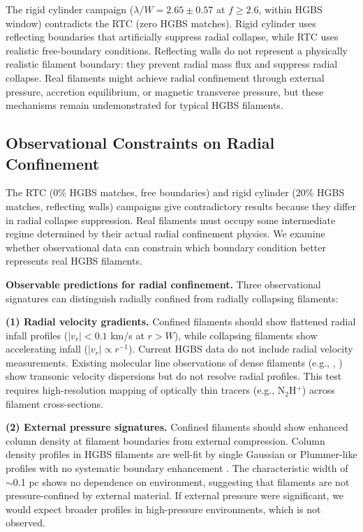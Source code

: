 \documentclass[twocolumn]{mnras}
\begin{document}
The rigid cylinder campaign ($\lambda/W = 2.65 \pm 0.57$ at $f \geq 2.6$, within HGBS window) contradicts the RTC (zero HGBS matches). Rigid cylinder uses reflecting boundaries that artificially suppress radial collapse, while RTC uses realistic free-boundary conditions. Reflecting walls do not represent a physically realistic filament boundary: they prevent radial mass flux and suppress radial collapse. Real filaments might achieve radial confinement through external pressure, accretion equilibrium, or magnetic transverse pressure, but these mechanisms remain undemonstrated for typical HGBS filaments.

\subsection{Observational Constraints on Radial Confinement}
\label{sec:radial_confinement}

The RTC (0\% HGBS matches, free boundaries) and rigid cylinder (20\% HGBS matches, reflecting walls) campaigns give contradictory results because they differ in radial collapse suppression. Real filaments must occupy some intermediate regime determined by their actual radial confinement physics. We examine whether observational data can constrain which boundary condition better represents real HGBS filaments.

\textbf{Observable predictions for radial confinement.}
Three observational signatures can distinguish radially confined from radially collapsing filaments:

\textbf{(1) Radial velocity gradients.}
Confined filaments should show flattened radial infall profiles ($|v_r| < 0.1$ km/s at $r > W$), while collapsing filaments show accelerating infall ($|v_r| \propto r^{-1}$). Current HGBS data do not include radial velocity measurements. Existing molecular line observations of dense filaments (e.g., \citet{Hacar2013}, \citet{Arzoumanian2013}) show transonic velocity dispersions but do not resolve radial profiles. This test requires high-resolution mapping of optically thin tracers (e.g., N$_2$H$^+$) across filament cross-sections.

\textbf{(2) External pressure signatures.}
Confined filaments should show enhanced column density at filament boundaries from external compression. Column density profiles in HGBS filaments are well-fit by single Gaussian or Plummer-like profiles with no systematic boundary enhancement \citep{Arzoumanian2011}. The characteristic width of $\sim$0.1 pc shows no dependence on environment, suggesting that filaments are not pressure-confined by external material. If external pressure were significant, we would expect broader profiles in high-pressure environments, which is not observed.
\end{document}
